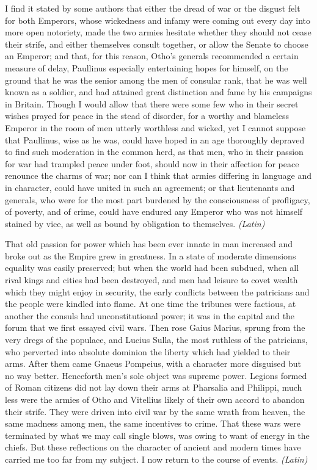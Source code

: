 I find it stated by some authors that either the dread of war or the disgust felt for both Emperors, whose wickedness and infamy were coming out every day into more open notoriety, made the two armies hesitate whether they should not cease their strife, and either themselves consult together, or allow the Senate to choose an Emperor; and that, for this reason, Otho's generals recommended a certain measure of delay, Paullinus especially entertaining hopes for himself, on the ground that he was the senior among the men of consular rank, that he was well known as a soldier, and had attained great distinction and fame by his campaigns in Britain. Though I would allow that there were some few who in their secret wishes prayed for peace in the stead of disorder, for a worthy and blameless Emperor in the room of men utterly worthless and wicked, yet I cannot suppose that Paullinus, wise as he was, could have hoped in an age thoroughly depraved to find such moderation in the common herd, as that men, who in their passion for war had trampled peace under foot, should now in their affection for peace renounce the charms of war; nor can I think that armies differing in language and in character, could have united in such an agreement; or that lieutenants and generals, who were for the most part burdened by the consciousness of profligacy, of poverty, and of crime, could have endured any Emperor who was not himself stained by vice, as well as bound by obligation to themselves. \emph{(Latin)}


That old passion for power which has been ever innate in man increased and broke out as the Empire grew in greatness. In a state of moderate dimensions equality was easily preserved; but when the world had been subdued, when all rival kings and cities had been destroyed, and men had leisure to covet wealth which they might enjoy in security, the early conflicts between the patricians and the people were kindled into flame. At one time the tribunes were factious, at another the consuls had unconstitutional power; it was in the capital and the forum that we first essayed civil wars. Then rose Gaius Marius, sprung from the very dregs of the populace, and Lucius Sulla, the most ruthless of the patricians, who perverted into absolute dominion the liberty which had yielded to their arms. After them came Gnaeus Pompeius, with a character more disguised but no way better. Henceforth men's sole object was supreme power. Legions formed of Roman citizens did not lay down their arms at Pharsalia and Philippi, much less were the armies of Otho and Vitellius likely of their own accord to abandon their strife. They were driven into civil war by the same wrath from heaven, the same madness among men, the same incentives to crime. That these wars were terminated by what we may call single blows, was owing to want of energy in the chiefs. But these reflections on the character of ancient and modern times have carried me too far from my subject. I now return to the course of events. \emph{(Latin)}

